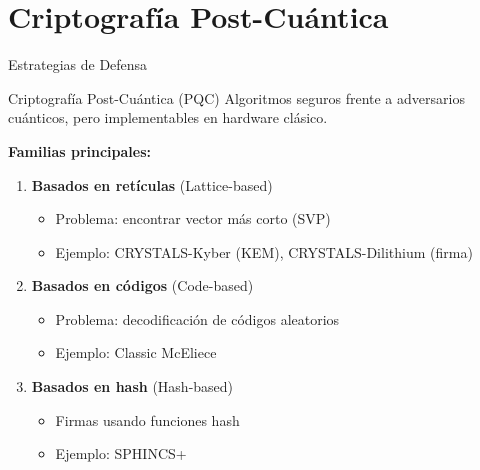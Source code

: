 \documentclass[aspectratio=169]{beamer}
\begin{document}
\section{Criptografía Post-Cuántica}

\begin{frame}{Estrategias de Defensa}
\begin{block}{Criptografía Post-Cuántica (PQC)}
Algoritmos seguros frente a adversarios cuánticos, pero implementables en hardware clásico.
\end{block}

\textbf{Familias principales:}
\begin{enumerate}
\item \textbf{Basados en retículas} (Lattice-based)
\begin{itemize}
\item Problema: encontrar vector más corto (SVP)
\item Ejemplo: CRYSTALS-Kyber (KEM), CRYSTALS-Dilithium (firma)
\end{itemize}

\item \textbf{Basados en códigos} (Code-based)
\begin{itemize}
\item Problema: decodificación de códigos aleatorios
\item Ejemplo: Classic McEliece
\end{itemize}

\item \textbf{Basados en hash} (Hash-based)
\begin{itemize}
\item Firmas usando funciones hash
\item Ejemplo: SPHINCS+
\end{itemize}
\end{enumerate}
\end{frame}
\end{document}
